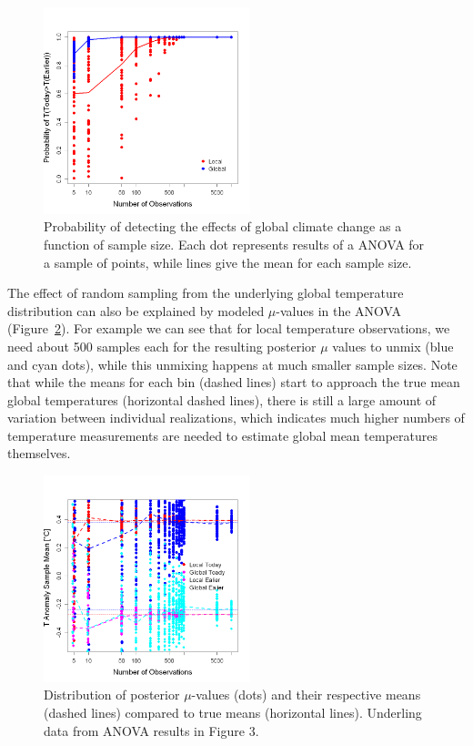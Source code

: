 \documentclass[letter, pt=10]{scrartcl}
\begin{document}
\begin{figure}[h!]
    \centering
    \includegraphics[width=6cm]{../Figures/Significance.png} %
    \caption{Probability of detecting the effects of global climate change as a function of sample size. Each dot represents results of a ANOVA for a sample of points, while lines give the mean for each sample size.}%
    \label{fig:result}%
\end{figure}

The effect of random sampling from the underlying global temperature distribution can also be explained by modeled $\mu$-values in the ANOVA (Figure~\ref{fig:means}). For example we can see that for local temperature observations, we need about 500 samples each for the resulting posterior $\mu$ values to unmix (blue and cyan dots), while this unmixing happens at much smaller sample sizes. Note that while the means for each bin (dashed lines) start to approach the true mean global temperatures (horizontal dashed lines), there is still a large amount of variation between individual realizations, which indicates much higher numbers of temperature measurements are needed to estimate global mean temperatures themselves.   

\begin{figure}[h!]
    \centering
    \includegraphics[width=6cm]{../Figures/Means.png} %
    \caption{Distribution of posterior $\mu$-values (dots) and their respective means (dashed lines) compared to true means (horizontal lines). Underling data from ANOVA results in Figure 3.}%
    \label{fig:means}%
\end{figure}
\end{document}
